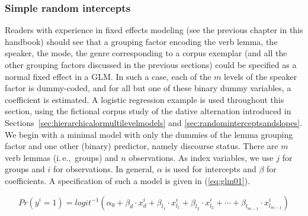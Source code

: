 \documentclass[a4paper,12pt]{article}
\newcommand{\ie}{i.\,e.,\ }
\begin{document}
\subsubsection{Simple random intercepts}

Readers with experience in fixed effects modeling (see the previous chapter in this handbook) should see that a grouping factor encoding the verb lemma, the speaker, the mode, the genre corresponding to a corpus exemplar (and all the other grouping factors discussed in the previous sections) could be specified as a normal fixed effect in a GLM.
In such a case, each of the $m$ levels of the speaker factor is dummy-coded, and for all but one of these binary dummy variables, a coefficient is estimated.
A logistic regression example is used throughout this section, using the fictional corpus study of the dative alternation introduced in Sections~\ref{sec:hierarchicalormultilevelmodels} and \ref{sec:randominterceptsandslopes}.
We begin with a minimal model with only the dummies of the lemma grouping factor and one other (binary) predictor, namely discourse status.
There are $m$ verb lemmas (\ie groups) and $n$ observations.
As index variables, we use $j$ for groups and $i$ for observations.
In general, $\alpha$ is used for intercepts and $\beta$ for coefficients.
A specification of such a model is given in (\ref{eq:glm01}).

\begin{equation}
  Pr(y^i=1)=logit^{-1}(\alpha_0+\beta_d\cdot x_{d}^i+\beta_{l_1}\cdot x_{l_1}^i+\beta_{l_2}\cdot x_{l_2}^i+\cdots+\beta_{l_{m-1}}\cdot x_{l_{m-1}}^i)
  \label{eq:glm01}
\end{equation}
\end{document}
